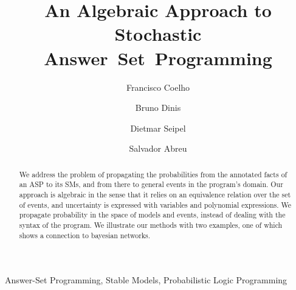 \documentclass{tlp}
\renewcommand{\cite}{\citep}
\newcommand{\spa}[1]{{\color{brown!80!black}{#1}}}
\begin{document}

\title{%
    An Algebraic Approach to Stochastic
    Answer~Set~Programming
}
\ifTLP

  \begin{authgrp}
    \author{ }

    \author{ }

    \author{ }

    \author{ }
  \end{authgrp}
\else
\author{%
    Francisco Coelho   \and %
    Bruno Dinis        \and %
    Dietmar Seipel       \and %
    Salvador Abreu     %
}

\fi
\maketitle

\begin{abstract}
  We address the problem of propagating the probabilities from the \spa{more, more!}
  annotated facts of an \acl{ASP} to its \aclp{SM}, and from there to
  general events in the program's domain.
  Our approach is algebraic in the sense that it relies on an
  equivalence relation over the set of events, and uncertainty is
  expressed with variables and polynomial expressions.
  We propagate probability in the space of models and events, instead
  of dealing with the syntax of the program.
  We illustrate our methods with two examples, one of which shows a
  connection to bayesian networks.
\end{abstract}

\begin{keywords}
  Answer-Set Programming, Stable Models, Probabilistic Logic Programming
\end{keywords}
\end{document}
